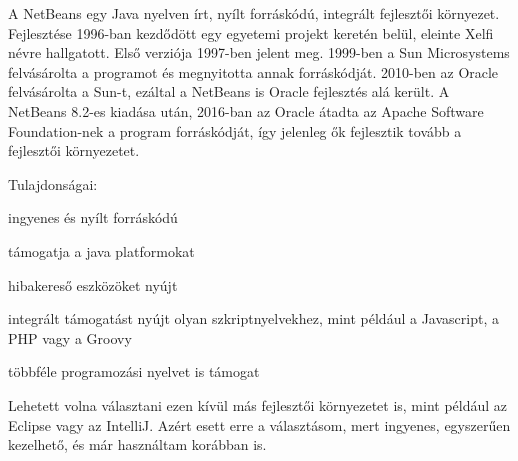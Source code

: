 A NetBeans egy Java nyelven írt, nyílt forráskódú, integrált fejlesztői környezet. Fejlesztése 1996-ban kezdődött egy egyetemi projekt keretén belül, eleinte Xelfi névre hallgatott. Első verziója 1997-ben jelent meg. 1999-ben a Sun Microsystems felvásárolta a programot és megnyitotta annak forráskódját. 2010-ben az Oracle felvásárolta a Sun-t, ezáltal a NetBeans is Oracle fejlesztés alá került. A NetBeans 8.2-es kiadása után, 2016-ban az Oracle átadta az Apache Software Foundation-nek a program forráskódját, így jelenleg ők fejlesztik tovább a fejlesztői környezetet. 

Tulajdonságai: 

ingyenes és nyílt forráskódú 

támogatja a java platformokat 

hibakereső eszközöket nyújt 

integrált támogatást nyújt olyan szkriptnyelvekhez, mint például a Javascript, a PHP vagy a Groovy 

többféle programozási nyelvet is támogat 

Lehetett volna választani ezen kívül más fejlesztői környezetet is, mint például az Eclipse vagy az IntelliJ. Azért esett erre a választásom, mert ingyenes, egyszerűen kezelhető, és már használtam korábban is. 
